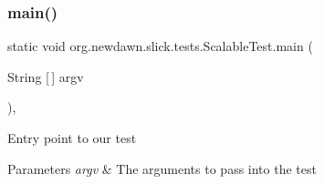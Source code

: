 \subsubsection{\texorpdfstring{main()}{main()}}
{\footnotesize\ttfamily static void org.\+newdawn.\+slick.\+tests.\+Scalable\+Test.\+main (\begin{DoxyParamCaption}\item[{String \mbox{[}$\,$\mbox{]}}]{argv }\end{DoxyParamCaption})\hspace{0.3cm}{\ttfamily [inline]}, {\ttfamily [static]}}

Entry point to our test


\begin{DoxyParams}{Parameters}
{\em argv} & The arguments to pass into the test \\
\hline
\end{DoxyParams}

